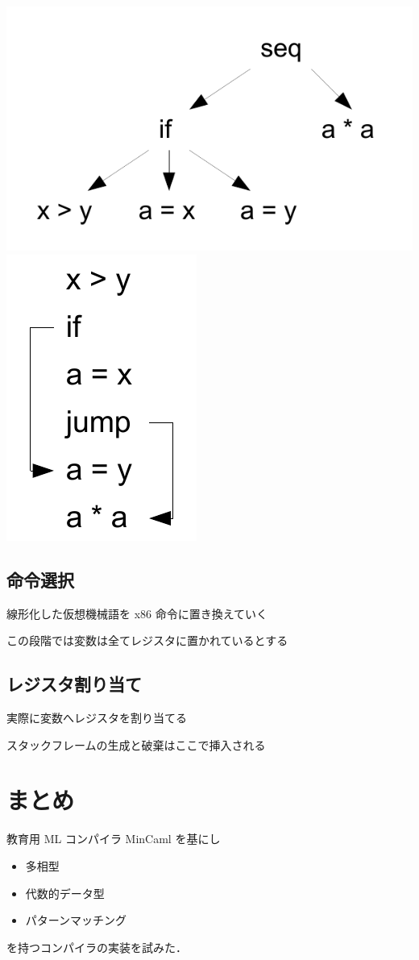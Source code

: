 \documentclass[papersize,30pt,slide]{jsarticle}
\begin{document}
\includegraphics[scale=0.3]{instree.pdf}
\includegraphics[scale=0.3]{insliner.pdf}

\subsection{命令選択}
線形化した仮想機械語を x86 命令に置き換えていく

この段階では変数は全てレジスタに置かれているとする

\subsection{レジスタ割り当て}
実際に変数へレジスタを割り当てる

スタックフレームの生成と破棄はここで挿入される

\section{まとめ}
教育用 ML コンパイラ MinCaml を基にし
\begin{itemize}
 \item 多相型
 \item 代数的データ型
 \item パターンマッチング
\end{itemize}
を持つコンパイラの実装を試みた．
\end{document}
